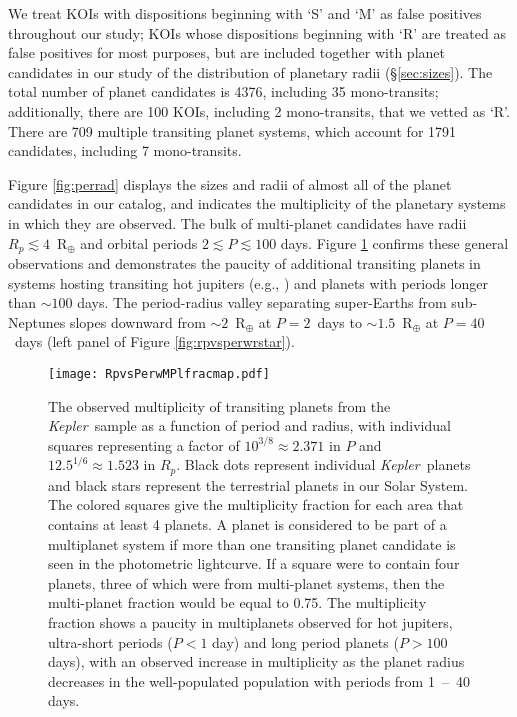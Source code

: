 \documentclass{aastex62}
\newcommand{\ik}{{\it Kepler~}}
\begin{document}
\bigskip
We treat KOIs with dispositions beginning with `S' and `M' as false positives throughout our study; KOIs whose dispositions beginning with `R' are treated as false positives for most purposes, but are included together with planet candidates in our study of the distribution of planetary radii (\S\ref{sec:sizes}).  The total number of planet candidates is 4376, including 35 mono-transits; additionally, there are 100 KOIs, including 2 mono-transits, that we vetted as `R'. There are 709 multiple transiting planet systems, which account for 1791 candidates, including {7 mono-transits}.%

Figure \ref{fig:perrad} displays the sizes and radii of almost all of the planet candidates in our catalog, and indicates the multiplicity of the planetary systems in which they are observed.  The bulk of multi-planet candidates have radii $R_p \lesssim 4$~R$_\oplus$ and orbital periods $2 \lesssim P \lesssim 100$ days.  Figure \ref{fig:perrad_multimap} confirms these general observations and demonstrates the paucity of additional transiting planets in systems hosting transiting hot jupiters (e.g., \citealt{Steffen:2012}) and planets with periods longer than $\sim 100$ days. The period-radius valley separating super-Earths from sub-Neptunes slopes downward from $\sim 2$~R$_\oplus$ at $P=2$~days to $\sim 1.5$~R$_\oplus$ at $P=40$~days (left panel of Figure \ref{fig:rpvsperwrstar}). %

\begin{figure}[!hbt]
\begin{center}
\texttt{[image: RpvsPerwMPlfracmap.pdf]}
\caption{The observed multiplicity of transiting planets from the \ik sample as a function of period and radius, with individual squares representing a factor of $10^{3/8} \approx 2.371$ in $P$ and $12.5^{1/6} \approx 1.523$ in $R_p$.  Black dots represent individual \ik planets and black stars represent the terrestrial planets in our Solar System.  The colored squares give the multiplicity fraction for each area that contains at least 4 planets.  A planet is considered to be part of a multiplanet system if more than one transiting planet candidate is seen in the photometric lightcurve.  If a square were to contain four planets, three of which were from multi-planet systems,  then the multi-planet fraction would be equal to 0.75.  The multiplicity fraction shows a paucity in multiplanets observed for hot jupiters, ultra-short periods ($P<1$ day) and long period planets ($P > 100$ days), with an observed increase in multiplicity as the planet radius decreases in the well-populated population with periods from 1~--~40 days.  
}\label{fig:perrad_multimap}
\end{center}
\end{figure}
\end{document}
